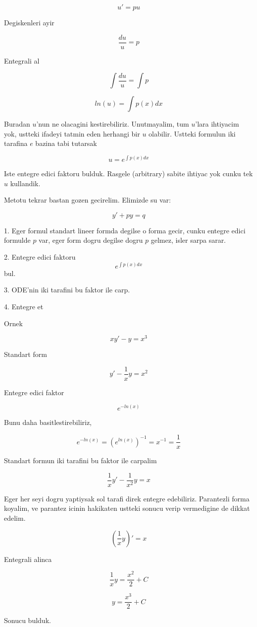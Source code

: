 \documentclass[12pt,fleqn]{article}\usepackage{../common}
\begin{document}
\[ u' = pu \]

Degiskenleri ayir

\[ \frac{du}{u} = p \]

Entegrali al

\[ \int \frac{du}{u}  = \int p \]

\[ ln (u) = \int p(x) dx \]

Buradan $u$'nun ne olacagini kestirebiliriz. Unutmayalim, tum $u$'lara
ihtiyacim yok, ustteki ifadeyi tatmin eden herhangi bir $u$
olabilir. Ustteki formulun iki tarafina $e$ bazina tabi tutarsak

\[ u = e^{\int p(x) dx} \]

Iste entegre edici faktoru bulduk. Rasgele (arbitrary) sabite ihtiyac
yok cunku tek $u$ kullandik.

Metotu tekrar bastan gozen gecirelim. Elimizde su var:

\[ y'+py = q \]

1. Eger formul standart lineer formda degilse o forma gecir, cunku
entegre edici formulde $p$ var, eger form dogru degilse dogru $p$
gelmez, isler sarpa sarar.

2. Entegre edici faktoru \[ e^{\int p(x) dx} \] bul.

3. ODE'nin iki tarafini bu faktor ile carp.

4. Entegre et

Ornek

\[ xy' - y= x^3 \]

Standart form

\[ y' - \frac{1}{x}y = x^2 \]

Entegre edici faktor

\[ e^{-ln(x)} \]

Bunu daha basitlestirebiliriz,

\[ e^{-ln(x)} = (e^{ln(x)})^{-1} = x^{-1} = \frac{1}{x}  \]

Standart formun iki tarafini bu faktor ile carpalim

\[ \frac{1}{x}y' - \frac{1}{x^2}y = x \]

Eger her seyi dogru yaptiysak sol tarafi direk entegre
edebiliriz. Parantezli forma koyalim, ve parantez icinin hakikaten
ustteki sonucu verip vermedigine de dikkat edelim.

\[ (\frac{1}{x}y)' = x \]

Entegrali alinca

\[ \frac{1}{x}y = \frac{x^2}{2} + C \]

\[ y = \frac{x^3}{2} + C \]

Sonucu bulduk.
\end{document}
